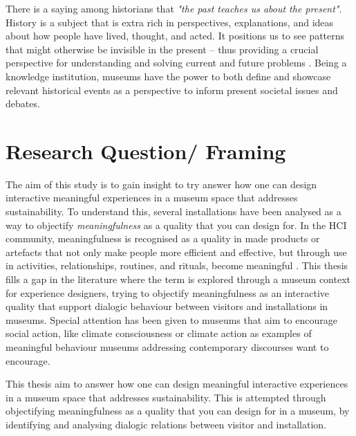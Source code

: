 There is a saying among historians that \emph{"the past teaches us about the present"}. History is a subject that is extra rich in perspectives, explanations, and ideas about how people have lived, thought, and acted. It positions us to see patterns that might otherwise be invisible in the present – thus providing a crucial perspective for understanding and solving current and future problems \autocite{UW_website}. Being a knowledge institution, museums have the power to both define and showcase relevant historical events as a perspective to inform present societal issues and debates. 



\section{Research Question/ Framing}
The aim of this study is to gain insight to try answer how one can design interactive meaningful experiences in a museum space that addresses sustainability. To understand this, several installations have been analysed as a way to objectify \emph{meaningfulness} as a quality that you can design for. In the HCI community, meaningfulness is recognised as a quality in made products or artefacts that not only make people more efficient and effective, but through use in activities, relationships, routines, and rituals, become meaningful \autocite{zimmerman_designing_2009}. This thesis fills a gap in the literature where the term is explored through a museum context for experience designers, trying to objectify meaningfulness as an interactive quality that support dialogic behaviour between visitors and installations in museums. Special attention has been given to museums that aim to encourage social action, like climate consciousness or climate action as examples of meaningful behaviour museums addressing contemporary discourses want to encourage.

This thesis aim to answer how one can design meaningful interactive experiences in a museum space that addresses sustainability. This is attempted through objectifying meaningfulness as a quality that you can design for in a museum, by identifying and analysing dialogic relations between visitor and installation.


